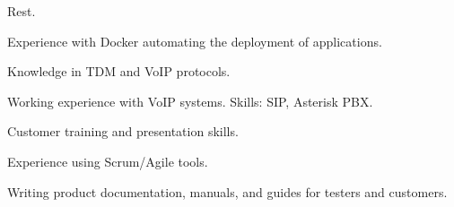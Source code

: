 \begin{cvparagraph}
\begin{svitems}
{    Rest.}
    \item {Experience with Docker automating the deployment of applications.}
    \item {Knowledge in TDM and VoIP protocols.}
    \item {Working experience with VoIP systems. Skills: SIP, Asterisk PBX.}
    \item {Customer training and presentation skills.}
    \item {Experience using Scrum/Agile tools.}
    \item {Writing product documentation, manuals, and guides for testers and customers.}
  \end{svitems}
\end{cvparagraph}

